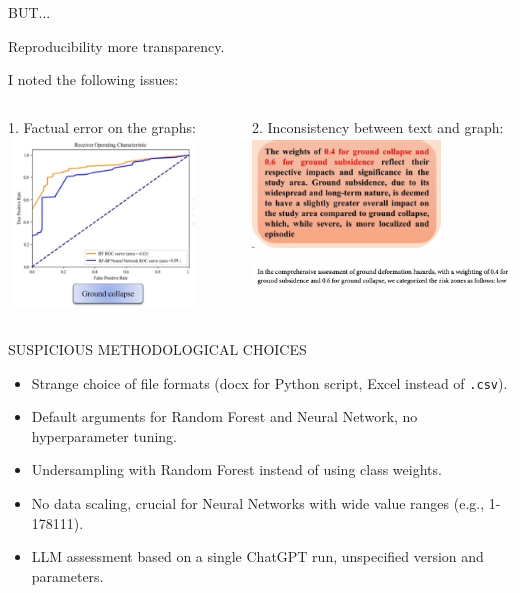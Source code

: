 \documentclass[11pt, aspectratio=169]{beamer}
\begin{document}
\begin{frame}{\MakeUppercase{But...}}

Reproducibility \textrightarrow more transparency.

I noted the following issues:

\begin{columns}[c]
    \begin{column}{.5\textwidth}
        1. Factual error on the graphs:
        \includegraphics[width=5cm,height=4.5cm]{images/wrong_roc}
    \end{column}
    \begin{column}{.5\textwidth}
        2. Inconsistency between text and graph:
\includegraphics[width=5cm,height=3cm]{images/weights} \\
\includegraphics[width=7cm,height=1cm]{images/wrong_weights}
    \end{column}
\end{columns}

\end{frame}


\begin{frame}{\MakeUppercase{Suspicious methodological choices}}

    \begin{itemize}
        \item Strange choice of file formats (docx for Python script, Excel instead of \texttt{.csv}).
        \item Default arguments for Random Forest and Neural Network, no hyperparameter tuning.
        \item Undersampling with Random Forest instead of using class weights.
        \item No data scaling, crucial for Neural Networks with wide value ranges (e.g., 1-178111).
        \item LLM assessment based on a single ChatGPT run, unspecified version and parameters.
    \end{itemize}

\end{frame}
\end{document}
